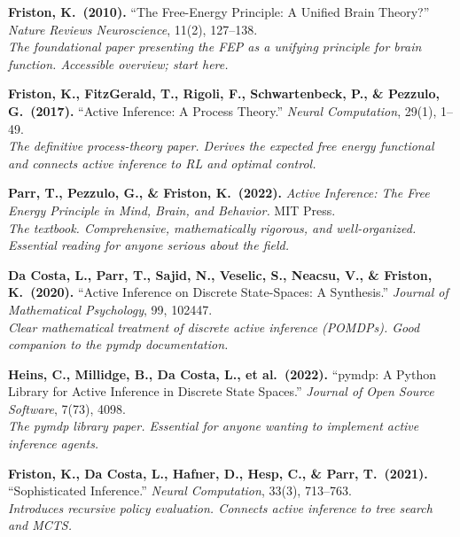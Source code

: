 \documentclass[11pt,a4paper]{article}
\theoremstyle{definition}
\begin{document}
\begin{enumerate}[leftmargin=2em, label={[\arabic*]}]

  \item \textbf{Friston, K.\ (2010).} ``The Free-Energy Principle: A Unified
    Brain Theory?'' \textit{Nature Reviews Neuroscience}, 11(2), 127--138.\\
    \textit{The foundational paper presenting the FEP as a unifying principle
    for brain function.  Accessible overview; start here.}

  \item \textbf{Friston, K., FitzGerald, T., Rigoli, F., Schwartenbeck, P.,
    \& Pezzulo, G.\ (2017).} ``Active Inference: A Process Theory.''
    \textit{Neural Computation}, 29(1), 1--49.\\
    \textit{The definitive process-theory paper.  Derives the expected free
    energy functional and connects active inference to RL and optimal control.}

  \item \textbf{Parr, T., Pezzulo, G., \& Friston, K.\ (2022).}
    \textit{Active Inference: The Free Energy Principle in Mind, Brain, and
    Behavior.}  MIT Press.\\
    \textit{The textbook.  Comprehensive, mathematically rigorous, and
    well-organized.  Essential reading for anyone serious about the field.}

  \item \textbf{Da Costa, L., Parr, T., Sajid, N., Veselic, S., Neacsu, V.,
    \& Friston, K.\ (2020).} ``Active Inference on Discrete State-Spaces: A
    Synthesis.'' \textit{Journal of Mathematical Psychology}, 99, 102447.\\
    \textit{Clear mathematical treatment of discrete active inference
    (POMDPs).  Good companion to the pymdp documentation.}

  \item \textbf{Heins, C., Millidge, B., Da Costa, L., et al.\ (2022).}
    ``pymdp: A Python Library for Active Inference in Discrete State Spaces.''
    \textit{Journal of Open Source Software}, 7(73), 4098.\\
    \textit{The pymdp library paper.  Essential for anyone wanting to
    implement active inference agents.}

  \item \textbf{Friston, K., Da Costa, L., Hafner, D., Hesp, C., \& Parr, T.\
    (2021).} ``Sophisticated Inference.'' \textit{Neural Computation}, 33(3),
    713--763.\\
    \textit{Introduces recursive policy evaluation.  Connects active inference
    to tree search and MCTS.}


\end{enumerate}
\end{document}
